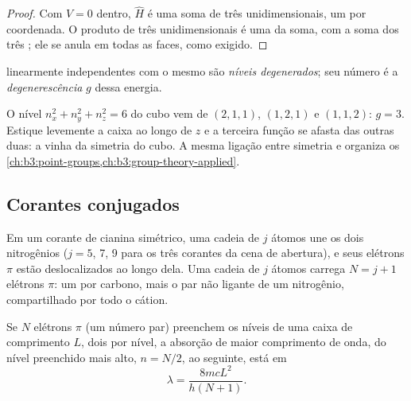 \begin{proof}
Com $V = 0$ dentro, $\hat H$ é uma soma de três  unidimensionais,
um por coordenada. O produto de três  unidimensionais é uma
 da soma, com a soma dos três ; ele se anula em todas
as faces, como exigido.
\end{proof}

\begin{definition}\label{def:b3:quantum-model-systems:degenerate}
 linearmente independentes com o mesmo  são
\emph{níveis degenerados}; seu número é a
\emph{degenerescência} $g$ dessa energia.
\end{definition}

\begin{example}\label{ex:b3:quantum-model-systems:cube}
O nível $n_x^2 + n_y^2 + n_z^2 = 6$ do cubo vem de $(2,1,1)$,
$(1,2,1)$ e $(1,1,2)$: $g = 3$. Estique levemente a caixa ao longo de $z$ e a
terceira função se afasta das outras duas: a  vinha da
simetria do cubo. A mesma ligação entre simetria e 
organiza os \cref{ch:b3:point-groups,ch:b3:group-theory-applied}.
\end{example}

\subsection*{Corantes conjugados}

Em um corante de cianina simétrico, uma cadeia de $j$ átomos une os dois
nitrogênios (\(j = 5\), 7, 9 para os três corantes da cena de abertura), e
seus elétrons $\pi$ estão deslocalizados ao longo dela. Uma cadeia de $j$
átomos carrega $N = j + 1$ elétrons $\pi$: um por carbono, mais o par não
ligante de um nitrogênio, compartilhado por todo o cátion.

\begin{proposition}\label{prop:b3:quantum-model-systems:free-electron}
Se $N$ elétrons $\pi$ (um número par) preenchem os níveis de uma caixa de
comprimento $L$, dois por nível, a absorção de maior comprimento de onda, do
nível preenchido mais alto, $n = N/2$, ao seguinte, está em
\[
\lambda = \frac{8mcL^2}{h(N+1)}.
\]
\end{proposition}


